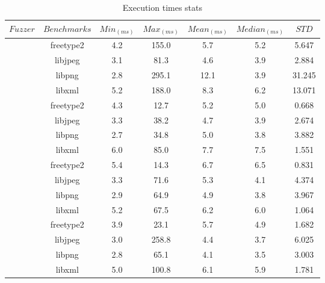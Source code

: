 \begin{table}[!t]
    \begin{tabular}{|l|c|c|c|c|c|c|} 
        \hline
        $Fuzzer$                            & $Benchmarks$ & $Min_{(ms)}$ & $Max_{(ms)}$ & $Mean_{(ms)}$ & $Median_{(ms)}$ & $STD$ \\
        \hline
        \rowcolor{gray!20} \multirow{4}{*}{Waffle} & freetype2           & 4.2      & 155.0      & 5.7       & 5.2                & 5.647 \\ \cline{2-7}
                                & libjpeg   & 3.1 &  81.3 &  4.6 & 3.9 & 2.884 \\ \cline{2-7}
                                & libpng    & 2.8 &  295.1 & 12.1 & 3.9 & 31.245 \\ \cline{2-7}
                                & libxml    & 5.2 & 188.0 & 8.3 & 6.2 & 13.071\\ \cline{2-7}
        \hline
        \rowcolor{gray!20} \multirow{4}{*}{AFL}    & freetype2 & 4.3 & 12.7 & 5.2 & 5.0 & 0.668 \\ \cline{2-7}
                                & libjpeg   &  3.3 &  38.2 &  4.7 & 3.9 & 2.674 \\ \cline{2-7}
                                & libpng    &   2.7 & 34.8 &  5.0 & 3.8 & 3.882 \\ \cline{2-7}
                                & libxml    & 6.0 & 85.0 & 7.7 & 7.5 & 1.551 \\ \cline{2-7}
        \hline
        \rowcolor{gray!20} \multirow{4}{*}{AFLFast}& freetype2 &  5.4 & 14.3 & 6.7 & 6.5 & 0.831 \\ \cline{2-7}
                                & libjpeg   &  3.3 &  71.6 &  5.3 & 4.1 & 4.374 \\ \cline{2-7}
                                & libpng    &  2.9 &  64.9 &  4.9 & 3.8 & 3.967 \\ \cline{2-7}
                                & libxml    &  5.2 & 67.5 & 6.2   & 6.0 & 1.064 \\ \cline{2-7}
        \hline
        \rowcolor{gray!20} \multirow{4}{*}{AFL++}  & freetype2 & 3.9 & 23.1 & 5.7 & 4.9 & 1.682 \\ \cline{2-7}
                                & libjpeg   & 3.0 &  258.8 &  4.4 & 3.7 & 6.025 \\ \cline{2-7}
                                & libpng    & 2.8 &  65.1 &  4.1  & 3.5 & 3.003 \\ \cline{2-7}
                                & libxml    & 5.0  & 100.8 & 6.1  & 5.9 & 1.781 \\ \cline{2-7}
        \hline
    \end{tabular}
    \caption{Execution times stats}
    \label{table:all-exe}
\end{table}



